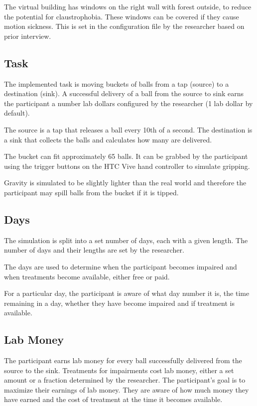 \documentclass{article}
\begin{document}
The virtual building has windows on the right wall with forest outside, to reduce the potential for claustrophobia. These windows can be covered if they cause motion sickness. This is set in the configuration file by the researcher based on prior interview.


\subsection{Task}

The implemented task is moving buckets of balls from a tap (source) to a destination (sink). A successful delivery of a ball from the source to sink earns the participant a number lab dollars configured by the researcher (1 lab dollar by default).

The source is a tap that releases a ball every 10th of a second. The destination is a sink that collects the balls and calculates how many are delivered.

The bucket can fit approximately 65 balls. It can be grabbed by the participant using the trigger buttons on the HTC Vive hand controller to simulate gripping.

Gravity is simulated to be slightly lighter than the real world and therefore the participant may spill balls from the bucket if it is tipped.


\subsection{Days}

The simulation is split into a set number of days, each with a given length. The number of days and their lengths are set by the researcher.

The days are used to determine when the participant becomes impaired and when treatments become available, either free or paid.

For a particular day, the participant is aware of what day number it is, the time remaining in a day, whether they have become impaired and if treatment is available.

\subsection{Lab Money}

The participant earns lab money for every ball successfully delivered from the source to the sink. Treatments for impairments cost lab money, either a set amount or a fraction determined by the researcher. The participant’s goal is to maximize their earnings of lab money. They are aware of how much money they have earned and the cost of treatment at the time it becomes available.
\end{document}
